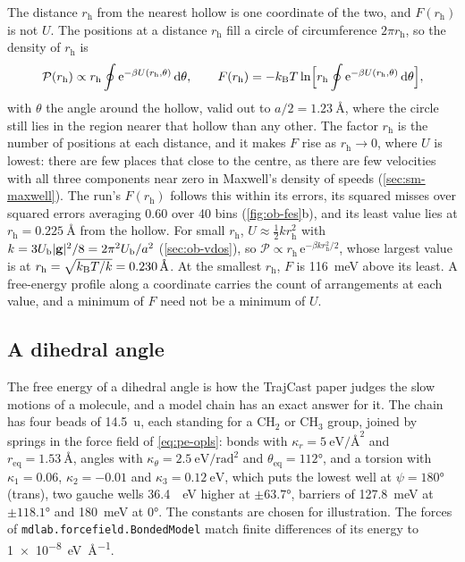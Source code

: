 The distance $r_{\mathrm h}$ from the nearest hollow is one coordinate of the two,
and $F(r_{\mathrm h})$ is not $U$. The positions at a distance $r_{\mathrm h}$ fill a circle of
circumference $2\pi r_{\mathrm h}$, so the density of $r_{\mathrm h}$ is
\begin{equation*}
   \mathcal{P}(r_{\mathrm h}) \propto r_{\mathrm h}\oint\mathrm{e}^{-\beta U(r_{\mathrm h}, \theta)}\,\mathrm{d}\theta ,
   \qquad
   F(r_{\mathrm h}) = -k_{\mathrm{B}} T\ln\Bigl[r_{\mathrm h}\oint\mathrm{e}^{-\beta U(r_{\mathrm h}, \theta)}\,\mathrm{d}\theta
   \Bigr] ,
\end{equation*}
with $\theta$ the angle around the hollow, valid out to $a/2 =
\SI{1.23}{\angstrom}$, where the circle still lies in the region nearer
that hollow than any other. The factor $r_{\mathrm h}$ is the number of positions at
each distance, and it makes $F$ rise as $r_{\mathrm h} \to 0$, where $U$ is lowest:
there are few places that close to the centre, as there are few
velocities with all three components near zero in Maxwell's density of
speeds (\cref{sec:sm-maxwell}). The run's $F(r_{\mathrm h})$ follows
this within its errors, its squared misses over squared errors averaging
0.60 over 40 bins (\cref{fig:ob-fes}b), and its least value lies at $r_{\mathrm h} =
\SI{0.225}{\angstrom}$ from the hollow. For small $r_{\mathrm h}$, $U \approx
\frac12 kr_{\mathrm h}^2$ with $k = 3U_{\mathrm b}\lvert\bm{\mathrm{g}}\rvert^2/8 =
2\pi^2U_{\mathrm b}/a^2$ (\cref{sec:ob-vdos}), so $\mathcal{P}
\propto r_{\mathrm h}\,\mathrm{e}^{-\beta kr_{\mathrm h}^2/2}$, whose largest value is at $r_{\mathrm h} =
\sqrt{k_{\mathrm{B}} T/k} = \SI{0.230}{\angstrom}$. At the smallest $r_{\mathrm h}$, $F$ is
\SI{116}{\milli\electronvolt} above its least. A free-energy profile along
a coordinate carries the count of arrangements at each value, and a
minimum of $F$ need not be a minimum of $U$.

\subsection*{A dihedral angle}

The free energy of a dihedral angle is how the TrajCast paper judges the
slow motions of a molecule\cite{Thiemann2026}, and a model chain has an
exact answer for it. The chain has four beads of \SI{14.5}{\amu}, each
standing for a CH$_2$ or CH$_3$ group, joined by springs in the force
field of \cref{eq:pe-opls}: bonds with $\kappa_r =
\SI{5}{\electronvolt\per\angstrom\squared}$ and $r_{\mathrm{eq}} =
\SI{1.53}{\angstrom}$, angles with $\kappa_\theta =
\SI{2.5}{\electronvolt\per\radian\squared}$ and $\theta_{\mathrm{eq}} =
\ang{112}$, and a torsion with $\kappa_1 = 0.06$, $\kappa_2 = -0.01$ and
$\kappa_3 = \SI{0.12}{\electronvolt}$, which puts the lowest well at
$\psi = \ang{180}$ (trans), two gauche wells \SI{36.4}{\milli
\electronvolt} higher at $\pm\ang{63.7}$, barriers of
\SI{127.8}{\milli\electronvolt} at $\pm\ang{118.1}$ and
\SI{180}{\milli\electronvolt} at \ang{0}. The constants are chosen for
illustration. The forces of \texttt{mdlab.forcefield.BondedModel} match
finite differences of its energy to \SI{1e-8}{\electronvolt\per\angstrom}.

